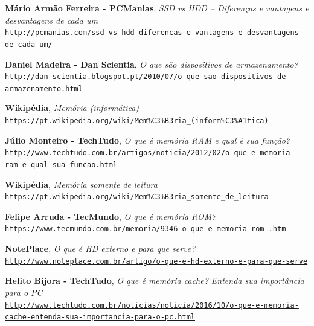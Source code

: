 \documentclass[a4paper]{report}
\begin{document}
\begin{thebibliography}{9}
\textbf{Mário Armão Ferreira - PCManias},
\textit{SSD vs HDD – Diferenças e vantagens e desvantagens de cada um}
\\\texttt{\url{http://pcmanias.com/ssd-vs-hdd-diferencas-e-vantagens-e-desvantagens-de-cada-um/}}

\textbf{Daniel Madeira - Dan Scientia},
\textit{O que são dispositivos de armazenamento?}
\\\texttt{\url{http://dan-scientia.blogspot.pt/2010/07/o-que-sao-dispositivos-de-armazenamento.html}} 

\textbf{Wikipédia},
\textit{Memória (informática)}
\\\texttt{\url{https://pt.wikipedia.org/wiki/Mem\%C3\%B3ria_(inform\%C3\%A1tica)}}

\textbf{Júlio Monteiro - TechTudo},
\textit{O que é memória RAM e qual é sua função?}
\\\texttt{\url{http://www.techtudo.com.br/artigos/noticia/2012/02/o-que-e-memoria-ram-e-qual-sua-funcao.html}}

\textbf{Wikipédia},
\textit{Memória somente de leitura}
\\\texttt{\url{https://pt.wikipedia.org/wiki/Mem\%C3\%B3ria_somente_de_leitura}}

\textbf{Felipe Arruda - TecMundo},
\textit{O que é memória ROM?}
\\\texttt{\url{https://www.tecmundo.com.br/memoria/9346-o-que-e-memoria-rom-.htm}}

\textbf{NotePlace},
\textit{O que é HD externo e para que serve?}
\\\texttt{\url{http://www.noteplace.com.br/artigo/o-que-e-hd-externo-e-para-que-serve}}

\textbf{Helito Bijora - TechTudo},
\textit{O que é memória cache? Entenda sua importância para o PC}
\\\texttt{\url{http://www.techtudo.com.br/noticias/noticia/2016/10/o-que-e-memoria-cache-entenda-sua-importancia-para-o-pc.html}}

\end{thebibliography}
\end{document}
